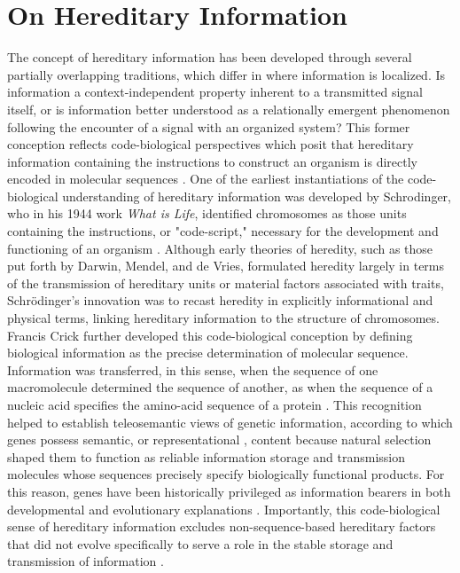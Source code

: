 \documentclass[pdflatex,sn-mathphys-num]{sn-jnl}
\theoremstyle{thmstylethree}
\theoremstyle{thmstyleone}
\begin{document}
\section{On Hereditary Information}
The concept of hereditary information has been developed through several partially overlapping traditions, which differ in where information is localized. Is information a context-independent property inherent to a transmitted signal itself, or is information better understood as a relationally emergent phenomenon following the encounter of a signal with an organized system? This former conception reflects code-biological perspectives which posit that hereditary information containing the instructions to construct an organism is directly encoded in molecular sequences \cite{maekivi2026methodological}. One of the earliest instantiations of the code-biological understanding of hereditary information was developed by Schrodinger, who in his 1944 work \textit{What is Life}, identified chromosomes as those units containing the instructions, or "code-script," necessary for the development and functioning of an organism \cite{schrodinger2012life}. Although early theories of heredity, such as those put forth by Darwin, Mendel, and de Vries, formulated heredity largely in terms of the transmission of hereditary units or material factors associated with traits, Schr\"{o}dinger's innovation was to recast heredity in explicitly informational and physical terms, linking hereditary information to the structure of chromosomes. Francis Crick further developed this code-biological conception by defining biological information as the precise determination of molecular sequence. Information was transferred, in this sense, when the sequence of one macromolecule determined the sequence of another, as when the sequence of a nucleic acid specifies the amino-acid sequence of a protein \cite{crick1958protein, pocheville2017crick}. This recognition helped to establish teleosemantic views of genetic information, according to which genes possess semantic, or representational \cite{shea2007representation}, content because natural selection shaped them to function as reliable information storage and transmission molecules whose sequences precisely specify biologically functional products. For this reason, genes have been historically privileged as information bearers in both developmental and evolutionary explanations \cite{maynardsmith2000information}. Importantly, this code-biological sense of hereditary information excludes non-sequence-based hereditary factors that did not evolve specifically to serve a role in the stable storage and transmission of information \cite{bergstrom2011transmission}.
\end{document}
